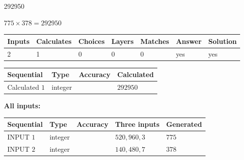 \documentclass{ctexart}
\begin{document}
 
 
\noindent{}
 
 

292950
 
 
\noindent{}
 
 

 
 
 
\noindent{}
 
 

$ %
775 \times  %
378=   %
292950$
 
 
\noindent{}
 
 

 
   
   
   
   
\noindent\begin{tabular}{|l|l|l|l|l|l|l|}
 \hline
Inputs & Calculates & Choices & Layers & Matches & Answer & Solution \\ \hline
 2  & 
 1  & 
 0
  & 
 0  & 
 0  & 
  yes & 
  yes 
  \\ \hline
 \end{tabular}
   
   
   
   
\noindent{}
   
   
  
  
\noindent\begin{tabular}{|l|l|l|l|}
\hline
 Sequential & Type & Accuracy & Calculated \\ 
\hline
 
 
  Calculated $  1 $ & integer &  & 
  $ 292950 $ 
 \\  \hline  
 \end{tabular}
   
   
   
   
\noindent\vspace{0.1in}\hspace{-0.08in} {\textbf{\Large{All inputs: }}}
   
   
  
  
\noindent\begin{tabular}{|l|l|l|l|l|}
\hline
 Sequential & Type & Accuracy & Three inputs & Generated \\ 
\hline
 
 
  INPUT $  1 $ & integer &  & $
 520
 , 
 960
 , 
 3
 $ & $ 775 $ 
 \\  \hline  
 
 
  INPUT $  2 $ & integer &  & $
 140
 , 
 480
 , 
 7
 $ & $ 378 $ 
 \\  \hline  
 \end{tabular}
   
\end{document}
